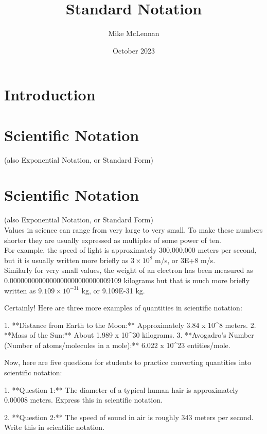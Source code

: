 \documentclass{article}
\title{Standard Notation}
\author{Mike McLennan}
\date{October 2023}
\begin{document}
\maketitle

\section{Introduction}

\section{Scientific Notation}
(also Exponential Notation, or Standard Form)\\

\section{Scientific Notation}
(also Exponential Notation, or Standard Form)\\

Values in science can range from very large to very small. To make these numbers shorter they are usually expressed as multiples of some power of ten.\\

For example, the speed of light is approximately 300,000,000 meters per second, but it is usually written more briefly as $3\times10^8$ m/s, or 3E+8 m/s.\\

Similarly for very small values, the weight of an electron has been measured as\\0.0000000000000000000000000009109 kilograms but that is much more briefly written as $9.109\times10^{-31}$ kg, or 9.109E-31 kg.

Certainly! Here are three more examples of quantities in scientific notation:

1. **Distance from Earth to the Moon:** Approximately 3.84 x 10^8 meters.
2. **Mass of the Sun:** About 1.989 x 10^30 kilograms.
3. **Avogadro's Number (Number of atoms/molecules in a mole):** 6.022 x 10^23 entities/mole.

Now, here are five questions for students to practice converting quantities into scientific notation:

1. **Question 1:** The diameter of a typical human hair is approximately 0.00008 meters. Express this in scientific notation.

2. **Question 2:** The speed of sound in air is roughly 343 meters per second. Write this in scientific notation.
\end{document}
